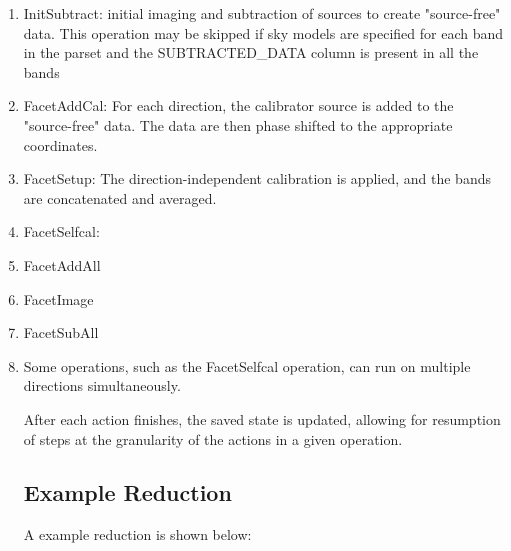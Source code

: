 \documentclass[structabstract]{article}
\begin{document}
{\begin{enumerate}
\item InitSubtract: initial imaging and subtraction of sources to create "source-free" data. This operation may be skipped if sky models are specified for each band in the parset and the SUBTRACTED_DATA column is present in all the bands
\item FacetAddCal: For each direction, the calibrator source is added to the "source-free" data. The data are then phase shifted to the appropriate coordinates.
\item FacetSetup: The direction-independent calibration is applied, and the bands are concatenated and averaged.
\item FacetSelfcal:
\item FacetAddAll
\item FacetImage
\item FacetSubAll
\item

Some operations, such as the FacetSelfcal operation, can run on multiple directions simultaneously.

After each action finishes, the saved state is updated, allowing for resumption of steps at the granularity of the actions in a given operation.


\subsection{Example Reduction}
\label{factor:example}

A example reduction is shown below:


\end{enumerate}}
\end{document}
